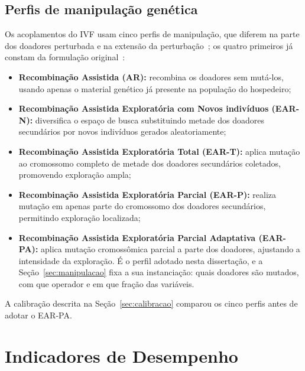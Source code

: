 \subsection{Perfis de manipulação genética}
\label{sec:ivf_perfis}

Os acoplamentos do IVF usam cinco perfis de manipulação, que diferem na parte dos doadores perturbada e na extensão da perturbação~\cite{camilo-junior2011,sampaio2017ivf,Sampaio2024}; os quatro primeiros já constam da formulação original~\cite{camilo-junior2011}:

\begin{itemize}
    \item \textbf{Recombinação Assistida (AR):} recombina os doadores sem mutá-los, usando apenas o material genético já presente na população do hospedeiro;
    
    \item \textbf{Recombinação Assistida Exploratória com Novos indivíduos (EAR-N):} diversifica o espaço de busca substituindo metade dos doadores secundários por novos indivíduos gerados aleatoriamente;
    
    \item \textbf{Recombinação Assistida Exploratória Total (EAR-T):} aplica mutação ao cromossomo completo de metade dos doadores secundários coletados, promovendo exploração ampla;
    
    \item \textbf{Recombinação Assistida Exploratória Parcial (EAR-P):} realiza mutação em apenas parte do cromossomo dos doadores secundários, permitindo exploração localizada;
    
    \item \textbf{Recombinação Assistida Exploratória Parcial Adaptativa (EAR-PA):} aplica mutação cromossômica parcial a parte dos doadores, ajustando a intensidade da exploração. É o perfil adotado nesta dissertação, e a Seção~\ref{sec:manipulacao} fixa a sua instanciação: quais doadores são mutados, com que operador e em que fração das variáveis.
\end{itemize}

A calibração descrita na Seção~\ref{sec:calibracao} comparou os cinco perfis antes de adotar o EAR-PA.

\section{Indicadores de Desempenho}
\label{sec:indicadores}

